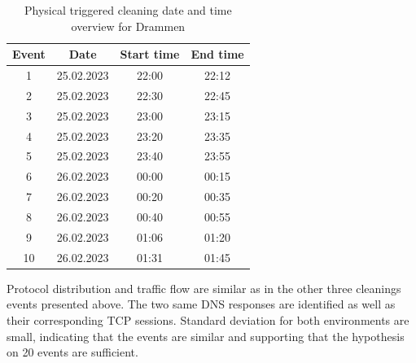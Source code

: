 \begin{table}[H]
\centering
\caption{Physical triggered cleaning date and time overview for Drammen}
\label{tab:PTC_dateandtimeDrammen}
\begin{tabular}{|c|c|c|c|}
\hline
\textbf{Event} & \textbf{Date} & \textbf{Start time} & \textbf{End time} \\ \hline
1              & 25.02.2023         & 22:00               & 22:12             \\ \hline
2              & 25.02.2023         & 22:30               & 22:45             \\ \hline
3              & 25.02.2023         & 23:00               & 23:15             \\ \hline
4              & 25.02.2023         & 23:20               & 23:35             \\ \hline
5              & 25.02.2023         & 23:40               & 23:55             \\ \hline
6              & 26.02.2023         & 00:00               & 00:15             \\ \hline
7              & 26.02.2023         & 00:20               & 00:35             \\ \hline
8              & 26.02.2023         & 00:40               & 00:55             \\ \hline
9              & 26.02.2023         & 01:06               & 01:20             \\ \hline
10             & 26.02.2023         & 01:31               & 01:45             \\ \hline
\end{tabular}
\end{table}

Protocol distribution and traffic flow are similar as in the other three cleanings events presented above. The two same \gls{DNS} responses are identified as well as their corresponding \gls{TCP} sessions. Standard deviation for both environments are small, indicating that the events are similar and supporting that the hypothesis on 20 events are sufficient. 

